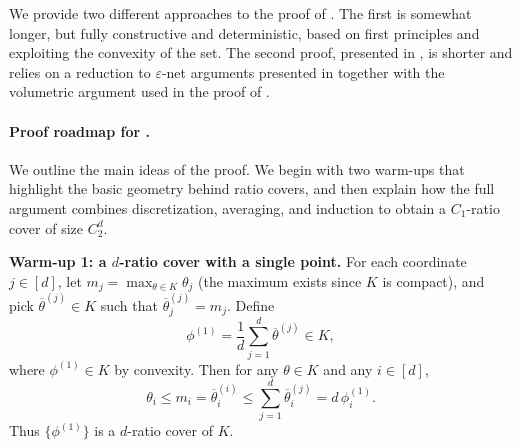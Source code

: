 \documentclass[11pt]{article}
\renewcommand{\le}{\leqslant}
\renewcommand{\triangleq}{=}
\theoremstyle{definition}
\theoremstyle{remark}
\begin{document}
We provide two different approaches to the proof of . The first is somewhat longer, but fully constructive and deterministic, based on first principles and exploiting the convexity of the set. The second proof, presented in , is shorter and relies on a reduction to $\varepsilon$-net arguments presented in \cite{diakonikolas2010small} together with the volumetric argument used in the proof of .


\paragraph{Proof roadmap for .}
We outline the main ideas of the proof. We begin with two warm-ups that highlight the basic geometry behind ratio covers, and then explain how the full argument combines discretization, averaging, and induction to obtain a $C_1$-ratio cover of size $C_2^d$.

\textbf{Warm-up 1: a $d$-ratio cover with a single point.}
For each coordinate $j\in[d]$, let $m_j=\max_{\theta\in K}\theta_j$ (the maximum exists since $K$ is compact), and pick $\overline{\theta}^{(j)}\in K$ such that $\overline{\theta}^{(j)}_j=m_j$.
Define
\[
\phi^{(1)} \triangleq \frac{1}{d}\sum_{j=1}^d \overline{\theta}^{(j)} \in K,
\]
where $\phi^{(1)}\in K$ by convexity.
Then for any $\theta\in K$ and any $i\in[d]$,
\[
\theta_i \le m_i = \overline{\theta}^{(i)}_i
\le \sum_{j=1}^d \overline{\theta}^{(j)}_i
= d\,\phi^{(1)}_i.
\]
Thus $\{\phi^{(1)}\}$ is a $d$-ratio cover of $K$.
\end{document}
